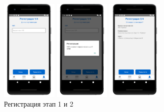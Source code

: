 \begin{figure}[!htb]\centering
    \begin{minipage}{0.19\textwidth}
        \centering

        \includegraphics[height=5cm]
        {images/mobile/registration/step1.png}
    \end{minipage}
    \begin{minipage}{0.19\textwidth}
        \centering

        \includegraphics[height=5cm]
        {images/mobile/registration/unp.png}
    \end{minipage}
    \begin{minipage}{0.19\textwidth}
        \centering

        \includegraphics[height=5cm]
        {images/mobile/registration/step2.png}
    \end{minipage}
  
    \caption{Регистрация этап 1 и 2}
    \label{fig:test_registration_step1}
\end{figure}

